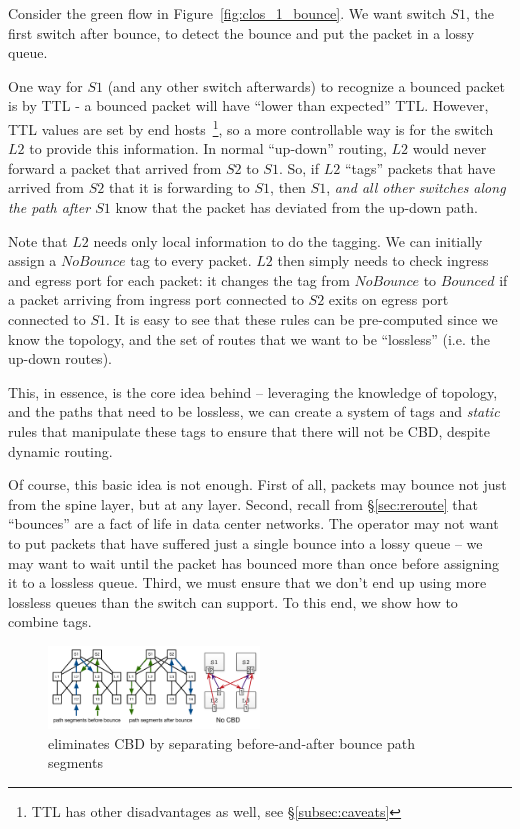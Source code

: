 Consider the green flow in Figure~\ref{fig:clos_1_bounce}.  We want switch $S1$,
the first switch after bounce, to detect the bounce and put the packet in a
lossy queue.

One way for $S1$ (and any other switch afterwards) to recognize a bounced packet
is by TTL - a bounced packet will have ``lower than expected'' TTL. However, TTL
values are set by end hosts~\footnote{TTL has other disadvantages as well,
see \S\ref{subsec:caveats}}, so a more controllable way is for the switch $L2$
to provide this information.  In normal ``up-down'' routing, $L2$ would never
forward a packet that arrived from $S2$ to $S1$. So, if $L2$ ``tags'' packets
that have arrived from $S2$ that it is forwarding to $S1$, then $S1$, {\em and
all other switches along the path after $S1$} know that the packet has deviated
from the up-down path.

Note that $L2$ needs only local information to do the tagging. We can initially
assign a $NoBounce$ tag to every packet. $L2$ then simply needs to check ingress
and egress port for each packet: it changes the tag from $NoBounce$ to $Bounced$
if a packet arriving from ingress port connected to $S2$ exits on egress port
connected to $S1$.  It is easy to see that these rules can be pre-computed since
we know the topology, and the set of routes that we want to be ``lossless''
(i.e. the up-down routes).

This, in essence, is the core idea behind \sysname{} -- leveraging the knowledge of
topology, and the paths that need to be lossless, we can create a system of tags
and {\em static} rules that manipulate these tags to ensure that there will not
be CBD, despite dynamic routing.

Of course, this basic idea is not enough. First of all, packets may bounce not
just from the spine layer, but at any layer. Second, recall from
\S\ref{sec:reroute} that ``bounces'' are a fact of life in data center networks.
The operator may not want to put packets that have suffered just a single bounce
into a lossy queue -- we may want to wait until the packet has bounced more than
once before assigning it to a lossless queue. Third, we must ensure that we
don't end up using more lossless queues than the switch can support. To this
end, we show how to combine tags.

\begin{figure}[t]
	\centering
	\includegraphics[width=0.5\textwidth] {figs/cbd_b}
	\caption{\sysname{} eliminates CBD by separating before-and-after bounce path segments}
	\label{fig:clos_tagger}
\end{figure}

